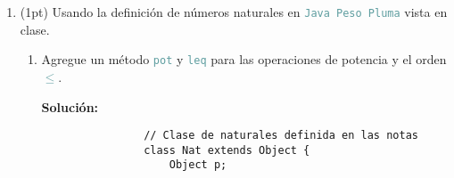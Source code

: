\documentclass{article}
\newcommand{\tx}[1]{\textcolor{CadetBlue} {\texttt{#1}}}
\newcommand{\tb}[1]{\textcolor{RoyalPurple} {\textbf{#1}}}
\newcommand{\pt}[1]{\textcolor{RoyalPurple}{(#1pt)}}
\begin{document}
\begin{enumerate}
\begin{itemize}
            Es es que \tx{+} ya no sería asociativa, lo cuál sí cumpliría si
            \tx{String $\not <$ Int}.

            \item \tx{String < Int} y \tx{=} sobrecargado

            Considere

            \begin{verbatim}
                "1q" = 1
                1 = "1e"
                "1q" /= "1e"
            \end{verbatim}

            Es decir, la igualdad ya no es transitiva, lo cuál es chocante
            porque ya no sería una relación de equivalencia.

            \item \tx{Int < String} y \tx{+} sobrecargado

            Considere

            \begin{verbatim}
                (1+2)+"a" = "3a"
                1+(2+"a") = "12a"
            \end{verbatim}

            Es es que \tx{+} ya no sería asociativa, lo cuál sí cumpliría si
            \tx{Int $\not <$ String}.

            Fuera de este inconveniente, todo respecto a los tipos se mantiene 
            en regla.

            \item \tx{Int < String} y \tx{=} sobrecargado
            \item \tx{+} y \tx{=} sobrecargados
        \end{itemize}

        \item \pt{1} Usando la definición de números naturales en 
        \tx{Java Peso Pluma} vista en clase.

        \begin{enumerate}
            \item Agregue un método \tx{pot} y \tx{leq} para las operaciones de
            potencia y el orden \tx{$\leq$}.

            \tb{Solución:}

            \begin{verbatim}
                // Clase de naturales definida en las notas
                class Nat extends Object {
                    Object p;


\end{verbatim}
\end{enumerate}
\end{enumerate}
\end{document}
